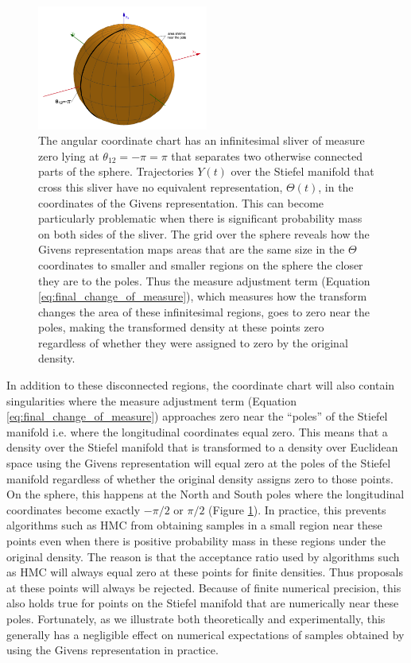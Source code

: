 \documentclass[ba]{imsart}
\numberwithin{equation}{section}
\theoremstyle{plain}
\begin{document}
\begin{figure}[h]
\centering
\vspace{.1in}
\includegraphics[width=0.5\textwidth]{figures/sliver_globe.png}
\vspace{.05in}
\caption{The angular coordinate chart has an infinitesimal sliver of measure zero lying at $\theta_{12} = -\pi = \pi$ that separates two otherwise connected parts of the sphere. Trajectories $Y(t)$ over the Stiefel manifold that cross this sliver have no equivalent representation, $\Theta(t)$, in the coordinates of the Givens representation. This can become particularly problematic when there is significant probability mass on both sides of the sliver. The grid over the sphere reveals how the Givens representation maps areas that are the same size in the $\Theta$ coordinates to smaller and smaller regions on the sphere the closer they are to the poles. Thus the measure adjustment term (Equation \ref{eq:final_change_of_measure}), which measures how the transform changes the area of these infinitesimal regions, goes to zero near the poles, making the transformed density at these points zero regardless of whether they were assigned to zero by the original density.}
\label{fig:pathologies}
\end{figure}

\noindent In addition to these disconnected regions, the coordinate chart will also contain singularities where the measure adjustment term (Equation \ref{eq:final_change_of_measure}) approaches zero near the ``poles'' of the Stiefel manifold i.e. where the longitudinal coordinates equal zero. This means that a density over the Stiefel manifold that is transformed to a density over Euclidean space using the Givens representation will equal zero at the poles of the Stiefel manifold regardless of whether the original density assigns zero to those points. On the sphere, this happens at the North and South poles where the longitudinal coordinates become exactly $-\pi/2$ or $\pi/2$ (Figure \ref{fig:pathologies}). In practice, this prevents algorithms such as HMC from obtaining samples in a small region near these points even when there is positive probability mass in these regions under the original density. The reason is that the acceptance ratio used by algorithms such as HMC will always equal zero at these points for finite densities. Thus proposals at these points will always be rejected. Because of finite numerical precision, this also holds true for points on the Stiefel manifold that are numerically near these poles. Fortunately, as we illustrate both theoretically and experimentally, this generally has a negligible effect on numerical expectations of samples obtained by using the Givens representation in practice.
\end{document}
